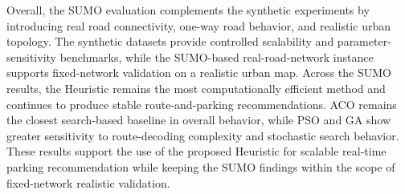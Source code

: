 Overall, the SUMO evaluation complements the synthetic experiments by introducing real road connectivity, one-way road behavior, and realistic urban topology. The synthetic datasets provide controlled scalability and parameter-sensitivity benchmarks, while the SUMO-based real-road-network instance supports fixed-network validation on a realistic urban map. Across the SUMO results, the Heuristic remains the most computationally efficient method and continues to produce stable route-and-parking recommendations. ACO remains the closest search-based baseline in overall behavior, while PSO and GA show greater sensitivity to route-decoding complexity and stochastic search behavior. These results support the use of the proposed Heuristic for scalable real-time parking recommendation while keeping the SUMO findings within the scope of fixed-network realistic validation.
